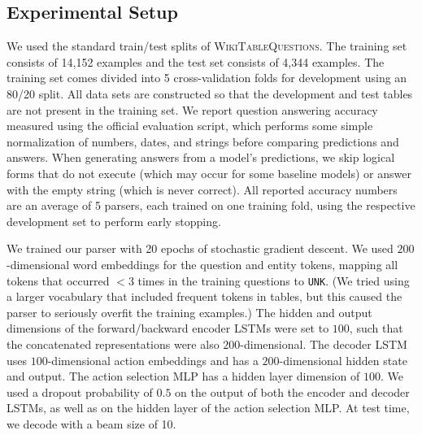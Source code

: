 \subsection{Experimental Setup}
We used the standard train/test splits of \textsc{WikiTableQuestions}.
The training set consists of 14,152 examples and the test set consists of 4,344 
examples.
The training set comes divided into 5 cross-validation folds for development 
using an 80/20 split.
All data sets are constructed so that the development and test tables are not 
present in the training set.
We report question answering accuracy measured using the official evaluation 
script, which performs some simple normalization of numbers, dates, and strings 
before comparing predictions and answers.
When generating answers from a model's predictions, we skip logical forms that 
do not execute (which may occur for some baseline models) or answer with the 
empty string (which is never correct).
All reported accuracy numbers are an average of 5 parsers, each trained on one 
training fold, using the respective development set to perform early stopping.

We trained our parser with 20 epochs of stochastic gradient descent. We used 
$200$-dimensional word embeddings for the question and entity tokens, mapping 
all tokens that occurred $<3$ times in the training questions to \texttt{UNK}. 
(We tried using a larger vocabulary that included frequent tokens in tables, 
but this caused the parser to seriously overfit the training examples.) The 
hidden and output dimensions of the forward/backward encoder LSTMs were set to 
$100$, such that the concatenated representations were also $200$-dimensional. 
The decoder LSTM uses $100$-dimensional action embeddings and has a 
$200$-dimensional hidden state and output. The action selection MLP has a 
hidden layer dimension of $100$. We used a dropout probability of $0.5$ on the 
output of both the encoder and decoder LSTMs, as well as on the hidden layer of 
the action selection MLP. At test time, we decode with a beam size of 10.

